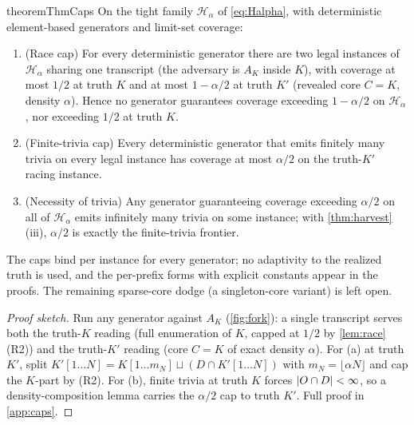 \documentclass[11pt]{article}
\numberwithin{equation}{section}
\newcommand{\mc}[1]{\mathcal{#1}}
\DeclarePairedDelimiter{\abs}{\lvert}{\rvert}
\newcommand{\Hcal}{\mc{H}}
\newcommand{\Hfam}{\Hcal_{\alpha}}
\newcommand{\Out}{O}
\newcommand{\Core}{C}
\newcommand{\rest}[2]{#1[1\!\dots\! #2]}
\theoremstyle{plain}
\theoremstyle{definition}
\theoremstyle{remark}
\begin{document}
\begin{restatable}{theorem}{ThmCaps}\label{thm:caps}
On the tight family $\Hfam$ of \eqref{eq:Halpha}, with deterministic element-based generators
and limit-set coverage:
\begin{enumerate}[label=\textup{(\alph*)}]
  \item \textup{(Race cap)} For every deterministic generator there are two legal instances of
    $\Hfam$ sharing one transcript (the adversary is $A_K$ inside $K$), with coverage at most
    $1/2$ at truth $K$ and at most $1 - \alpha/2$ at truth $K'$ (revealed core $\Core = K$,
    density $\alpha$). Hence no generator guarantees coverage exceeding $1 - \alpha/2$ on
    $\Hfam$, nor exceeding $1/2$ at truth $K$.
  \item \textup{(Finite-trivia cap)} Every deterministic generator that emits finitely many
    trivia on every legal instance has coverage at most $\alpha/2$ on the truth-$K'$ racing
    instance.
  \item \textup{(Necessity of trivia)} Any generator guaranteeing coverage exceeding
    $\alpha/2$ on all of $\Hfam$ emits infinitely many trivia on some instance; with
    \cref{thm:harvest}\textup{(iii)}, $\alpha/2$ is exactly the finite-trivia frontier.
\end{enumerate}
\end{restatable}

The caps bind per instance for every generator; no adaptivity to the realized truth is used,
and the per-prefix forms with explicit constants appear in the proofs. The remaining
sparse-core dodge (a singleton-core variant) is left open.

\begin{proof}[Proof sketch]
Run any generator against $A_K$ (\cref{fig:fork}): a single transcript serves both the
truth-$K$ reading (full enumeration of $K$, capped at $1/2$ by \cref{lem:race}(R2)) and the
truth-$K'$ reading (core $\Core = K$ of exact density $\alpha$). For (a) at truth $K'$, split
$\rest{K'}{N} = \rest{K}{m_N} \sqcup (D \cap \rest{K'}{N})$ with $m_N = \lfloor \alpha N
\rfloor$ and cap the $K$-part by (R2). For (b), finite trivia at truth $K$ forces $\abs{\Out
\cap D} < \infty$, so a density-composition lemma carries the $\alpha/2$ cap to truth $K'$.
Full proof in \cref{app:caps}.
\end{proof}
\end{document}
